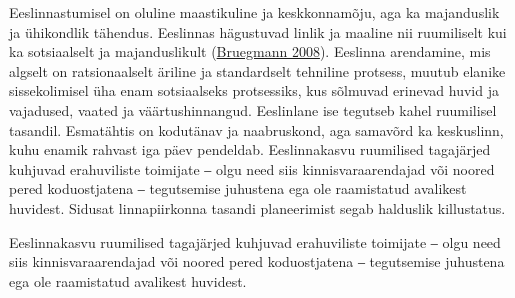 \documentclass[estonian,]{article}
\begin{document}
Eeslinnastumisel on oluline maastikuline ja keskkonnamõju, aga ka majanduslik ja ühikondlik tähendus. Eeslinnas hägustuvad linlik ja maaline nii ruumiliselt kui ka sotsiaalselt ja majanduslikult (\protect\hyperlink{Bruegmann2008}{Bruegmann 2008}). Eeslinna arendamine, mis algselt on ratsionaalselt äriline ja standardselt tehniline protsess, muutub elanike sissekolimisel üha enam sotsiaalseks protsessiks, kus sõlmuvad erinevad huvid ja vajadused, vaated ja väärtushinnangud. Eeslinlane ise tegutseb kahel ruumilisel tasandil. Esmatähtis on kodutänav ja naabruskond, aga samavõrd ka keskuslinn, kuhu enamik rahvast iga päev pendeldab. Eeslinnakasvu ruumilised tagajärjed kuhjuvad erahuviliste toimijate ‒ olgu need siis kinnisvaraarendajad või noored pered koduostjatena ‒ tegutsemise juhustena ega ole raamistatud avalikest huvidest. Sidusat linnapiirkonna tasandi planeerimist segab halduslik killustatus.

\begin{blockquote-right}
Eeslinnakasvu ruumilised tagajärjed kuhjuvad erahuviliste toimijate ‒
olgu need siis kinnisvaraarendajad või noored pered koduostjatena ‒
tegutsemise juhustena ega ole raamistatud avalikest huvidest.
\end{blockquote-right}
\end{document}
